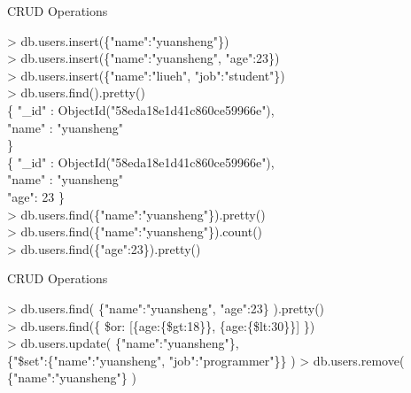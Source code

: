 \documentclass{beamer}
\begin{document}
\begin{frame}{CRUD Operations}
    \begin{minipage}[t]{0.7\textwidth}
        \scriptsize
        \begin{Alms*}
            > db.users.insert(\{"name":"yuansheng"\}) \\
            > db.users.insert(\NI\{"name":"yuansheng", "age":23\}\ND) \\
            > db.users.insert(\NI\{"name":"liueh", "job":"student"\}\ND) \\
            > db.users.find().pretty() \\
            \{ \NI
                "\_id" : ObjectId("58eda18e1d41c860ce59966e"), \\
                "name" : "yuansheng" \\
            \ND \} \\
            \{ \NI
                "\_id" : ObjectId("58eda18e1d41c860ce59966e"), \\
                "name" : "yuansheng" \\
                "age": 23
            \ND \} \\
            > db.users.find(\{"name":"yuansheng"\}).pretty() \\
            > db.users.find(\{"name":"yuansheng"\}).count() \\
            > db.users.find(\{"age":23\}).pretty() \\
        \end{Alms*}
    \end{minipage}
\end{frame}

\begin{frame}{CRUD Operations}
	\begin{minipage}[t]{0.45\textwidth}
		\scriptsize
		\begin{Alms*}
			> db.users.find(\NI
			\{"name":"yuansheng", "age":23\}
			\ND).pretty() \\
			> db.users.find(\{ \NI\$or: [\{age:\{\$gt:18\}\}, \{age:\{\$lt:30\}\}] \ND\})\\
			> db.users.update(\NI
			\{"name":"yuansheng"\},\\
			\{"\$set":\{"name":"yuansheng", "job":"programmer"\}\}
			\ND)
			> db.users.remove(\NI
			\{"name":"yuansheng"\}
			\ND )
		\end{Alms*}
	\end{minipage}
\end{frame}
\end{document}
